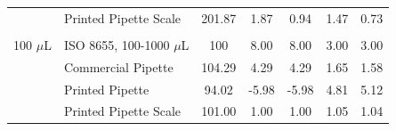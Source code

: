 \documentclass[10pt,letterpaper]{article}
\begin{document}
\begin{table}[!ht]
\begin{adjustwidth}{-2.25in}{0in}
\begin{tabular}{llccccc}
			& Printed Pipette Scale & 201.87  & 1.87             & 0.94         & 1.47         & 0.73          \\
			&                       &         &                  &              &              &               \\
			100 $\mu$L  & ISO 8655, 100-1000 $\mu$L & 100     & 8.00             & 8.00         & 3.00         & 3.00          \\
			& Commercial Pipette    & 104.29  & 4.29             & 4.29         & 1.65         & 1.58          \\
			& Printed Pipette       & 94.02   & -5.98            & -5.98        & 4.81         & 5.12          \\
			& Printed Pipette Scale & 101.00  & 1.00             & 1.00         & 1.05         & 1.04         
		\end{tabular}
	\end{adjustwidth}
\end{table}
\end{document}
